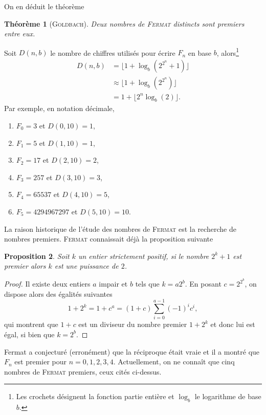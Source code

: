 \documentclass[a4paper,11pt]{article}
\theoremstyle{plain}
\newtheorem{thm}{Théorème}[section]
\newtheorem{prop}[thm]{Proposition}
\theoremstyle{definition}
\theoremstyle{remark}
\newcommand{\nom}[1]{\textsc{#1}\xspace}
\newcommand{\fermat}{\nom{Fermat}}
\begin{document}
On en déduit le théorème 
\begin{thm}[\textsc{Goldbach}]
Deux nombres de \fermat distincts sont premiers entre eux.
\end{thm}


        

Soit $D(n, b)$ le nombre de chiffres utilisés pour écrire $F_n$ en base $b$, alors\footnote{Les crochets désignent la fonction partie entière et $\log_b$ le logarithme de base $b$.} 
\begin{align}
D(n,b)&= \lfloor 1+\log_b\left( 2^{2^n}+1 \right) \rfloor\\
    &\approx \lfloor 1+\log_b\left( 2^{2^n}\right) \rfloor\\
	&=1+\lfloor 2^n\log_b(2)\rfloor.
\end{align}
Par exemple, en notation décimale, 
\begin{enumerate}
\item $F_0=3$ et $D(0,10)=1$,
\item $F_1=5$ et $D(1,10)=1$, 
\item $F_2=17$ et $D(2,10)=2$, 
\item $F_3=257$ et $D(3,10)=3$, 
\item $F_4=65537$ et $D(4,10)=5$, 
\item $F_5=4294967297$ et $D(5,10)=10$.
\end{enumerate}


La raison historique de l'étude des nombres de \fermat est la recherche de nombres premiers. \fermat connaissait déjà la proposition suivante
\begin{prop}
Soit $k$ un entier strictement positif, si le nombre $2^k + 1$ est premier alors $k$ est une puissance de $2$.
\end{prop}
\begin{proof}
Il existe deux entiers $a$ impair et $b$ tels que $k = a 2^b$. En posant $c = 2^{2^b}$, on dispose alors des égalités suivantes
\[
1+2^k =1 + c^a= (1 + c)\sum_{i=0}^{a-1} (-1)^i c^i,
\]
qui montrent que $1 + c$ est un diviseur du nombre premier $1 + 2^k$ et donc lui est égal, si bien que $k = 2^b$.
\end{proof}
Fermat a conjecturé (erronément) que la réciproque était vraie et il a montré que $F_n$ est premier pour $n=0,1,2,3,4$. Actuellement, on ne connaît que cinq nombres de \fermat premiers, ceux cités ci-dessus.
        
\end{document}

